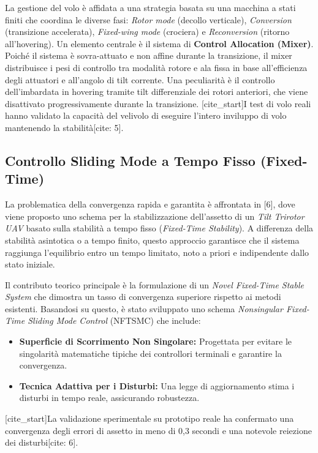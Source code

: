 \documentclass[a4paper,12pt]{article}
\begin{document}
La gestione del volo è affidata a una strategia basata su una macchina a stati finiti che coordina le diverse fasi: \textit{Rotor mode} (decollo verticale), \textit{Conversion} (transizione accelerata), \textit{Fixed-wing mode} (crociera) e \textit{Reconversion} (ritorno all'hovering).
Un elemento centrale è il sistema di \textbf{Control Allocation (Mixer)}. Poiché il sistema è sovra-attuato e non affine durante la transizione, il mixer distribuisce i pesi di controllo tra modalità rotore e ala fissa in base all'efficienza degli attuatori e all'angolo di tilt corrente. Una peculiarità è il controllo dell'imbardata in hovering tramite tilt differenziale dei rotori anteriori, che viene disattivato progressivamente durante la transizione.
[cite_start]I test di volo reali hanno validato la capacità del velivolo di eseguire l'intero inviluppo di volo mantenendo la stabilità[cite: 5].

\subsection{Controllo Sliding Mode a Tempo Fisso (Fixed-Time)}
La problematica della convergenza rapida e garantita è affrontata in [6], dove viene proposto uno schema per la stabilizzazione dell'assetto di un \textit{Tilt Trirotor UAV} basato sulla stabilità a tempo fisso (\textit{Fixed-Time Stability}). A differenza della stabilità asintotica o a tempo finito, questo approccio garantisce che il sistema raggiunga l'equilibrio entro un tempo limitato, noto a priori e indipendente dallo stato iniziale.

Il contributo teorico principale è la formulazione di un \textit{Novel Fixed-Time Stable System} che dimostra un tasso di convergenza superiore rispetto ai metodi esistenti. Basandosi su questo, è stato sviluppato uno schema \textit{Nonsingular Fixed-Time Sliding Mode Control} (NFTSMC) che include:
\begin{itemize}
    \item \textbf{Superficie di Scorrimento Non Singolare:} Progettata per evitare le singolarità matematiche tipiche dei controllori terminali e garantire la convergenza.
    \item \textbf{Tecnica Adattiva per i Disturbi:} Una legge di aggiornamento stima i disturbi in tempo reale, assicurando robustezza.
\end{itemize}
[cite_start]La validazione sperimentale su prototipo reale ha confermato una convergenza degli errori di assetto in meno di 0,3 secondi e una notevole reiezione dei disturbi[cite: 6].
\end{document}
